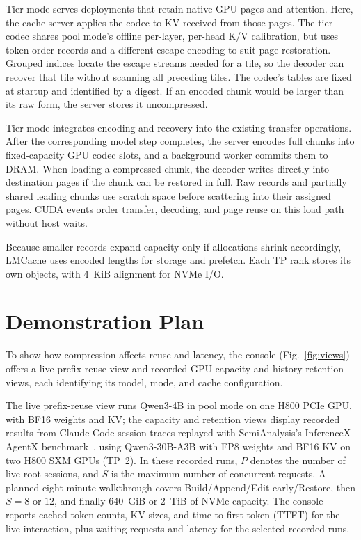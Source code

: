 \documentclass[conference]{IEEEtran}
\begin{document}
Tier mode serves deployments that retain native GPU pages and attention.
Here, the cache server applies the codec to KV received from those pages.
The tier codec shares pool mode's offline per-layer, per-head K/V
calibration, but uses token-order records and a different escape encoding to suit page
restoration. Grouped indices locate the escape streams needed for a tile,
so the decoder can recover that tile without scanning all preceding tiles.
The codec's tables are fixed at startup and identified by a digest. If an encoded
chunk would be larger than its raw form, the server stores it uncompressed.

Tier mode integrates encoding and recovery into the existing transfer
operations. After the corresponding model step completes, the server encodes
full chunks into
fixed-capacity GPU codec slots, and a background worker commits them to
DRAM. When loading a compressed chunk, the decoder writes directly into
destination pages if the chunk can be restored in full. Raw records and
partially shared leading chunks use scratch space before scattering into their
assigned pages. CUDA events order transfer, decoding, and page reuse on
this load path without host waits.

Because smaller records expand capacity only if allocations shrink accordingly,
LMCache uses encoded lengths for storage and prefetch. Each TP rank stores its
own objects, with 4~KiB alignment for NVMe I/O.

\section{Demonstration Plan}
\label{sec:demo}
To show how compression affects reuse and latency, the console
(Fig.~\ref{fig:views}) offers a live prefix-reuse view and recorded GPU-capacity
and history-retention views, each identifying its model, mode, and cache configuration.

The live prefix-reuse view runs Qwen3-4B in pool mode on one H800 PCIe GPU, with
BF16 weights and KV; the capacity and retention views display recorded
results from Claude Code session traces replayed with SemiAnalysis's
InferenceX AgentX benchmark~\cite{agentx}, using Qwen3-30B-A3B with FP8
weights and BF16 KV on two H800 SXM GPUs (TP~2).
In these recorded runs, $P$ denotes the number of live root sessions, and $S$
is the maximum number of concurrent requests.
A planned eight-minute walkthrough covers Build/Append/Edit early/Restore,
then $S=8$ or $12$, and finally 640~GiB or 2~TiB of NVMe capacity.
The console reports cached-token counts, KV sizes, and time to first token
(TTFT) for the live interaction, plus waiting requests and latency for the
selected recorded runs.
\end{document}
